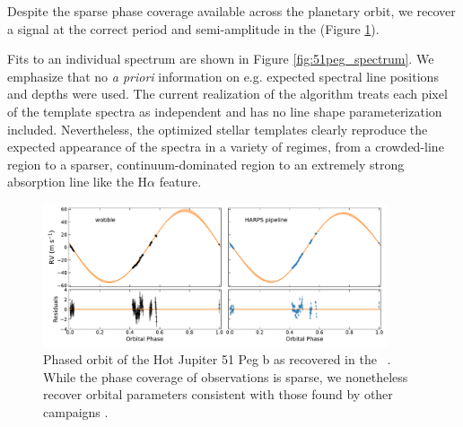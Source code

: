 \documentclass[modern]{aastex62}
\begin{document}
Despite the sparse phase coverage available across the planetary orbit, we recover a signal at the correct period and semi-amplitude in the \RVs (Figure \ref{fig:51peg_planet}). 

Fits to an individual spectrum are shown in Figure \ref{fig:51peg_spectrum}. 
We emphasize that no \textit{a priori} information on e.g. expected spectral line positions and depths were used. 
The current realization of the \wobble algorithm treats each pixel of the template spectra as independent and has no line shape parameterization included. 
Nevertheless, the optimized stellar templates clearly reproduce the expected appearance of the spectra in a variety of regimes, from a crowded-line region to a sparser, continuum-dominated region to an extremely strong absorption line like the H$\alpha$ feature.

\begin{figure}
\centering
\includegraphics[width=4in]{51peg_planet}
\caption{Phased orbit of the Hot Jupiter 51 Peg b as recovered in the \wobble\ \RVs. While the phase coverage of \HARPS observations is sparse, we nonetheless recover orbital parameters consistent with those found by other \RV campaigns .  }
\label{fig:51peg_planet}
\end{figure}
\end{document}
